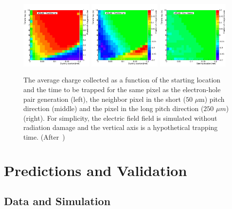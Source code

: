 \begin{figure}[!htpb]
\centering
\includegraphics[width=0.32\textwidth]{newtestramo_corrected_other.pdf}
\includegraphics[width=0.32\textwidth]{newtestramo_induced_0_1.pdf}
\includegraphics[width=0.32\textwidth]{newtestramo_induced_1_0.pdf}
\caption{The average charge collected as a function of the starting location and the time to be trapped for the same pixel as the electron-hole pair generation (left), the neighbor pixel in the short ($50$ $\mu $m) pitch direction (middle) and the pixel in the long pitch direction ($250$ $\mu m$) (right).  For simplicity, the electric field field is simulated without radiation damage and the vertical axis is a hypothetical trapping time. (After~\cite{Benoit:2255825})}
\label{fig:ramo:check}
\end{figure}



\section{Predictions and Validation}
\label{sec:digivalidation}


\subsection{Data and Simulation}

